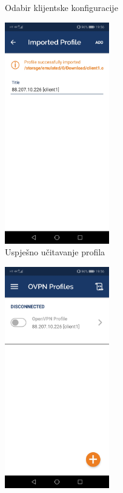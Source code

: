 \begin{figure}[h]
\begin{subfigure}{0.49\textwidth}
		\caption{Odabir klijentske konfiguracije}
		\label{fig:screenshot20181214-195554}
	\end{subfigure}
	\begin{subfigure}{0.49\textwidth}
		\centering
		\includegraphics[width = 0.5\textwidth]{slike/OpenVPN/Screenshot_20181214-195602}
		\caption{Uspješno učitavanje profila}
		\label{fig:screenshot20181214-195602}
	\end{subfigure}
	\begin{subfigure}{0.49\textwidth}
		\centering
		\includegraphics[width = 0.5\textwidth]{slike/OpenVPN/Screenshot_20181214-195614}

\end{subfigure}
\end{figure}
